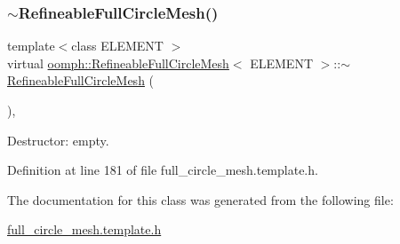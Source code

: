 \subsubsection{\texorpdfstring{$\sim$\+Refineable\+Full\+Circle\+Mesh()}{~RefineableFullCircleMesh()}}
{\footnotesize\ttfamily template$<$class E\+L\+E\+M\+E\+NT $>$ \\
virtual \hyperlink{classoomph_1_1RefineableFullCircleMesh}{oomph\+::\+Refineable\+Full\+Circle\+Mesh}$<$ E\+L\+E\+M\+E\+NT $>$\+::$\sim$\hyperlink{classoomph_1_1RefineableFullCircleMesh}{Refineable\+Full\+Circle\+Mesh} (\begin{DoxyParamCaption}{ }\end{DoxyParamCaption})\hspace{0.3cm}{\ttfamily [inline]}, {\ttfamily [virtual]}}



Destructor\+: empty. 



Definition at line 181 of file full\+\_\+circle\+\_\+mesh.\+template.\+h.



The documentation for this class was generated from the following file\+:\begin{DoxyCompactItemize}
\item 
\hyperlink{full__circle__mesh_8template_8h}{full\+\_\+circle\+\_\+mesh.\+template.\+h}\end{DoxyCompactItemize}

